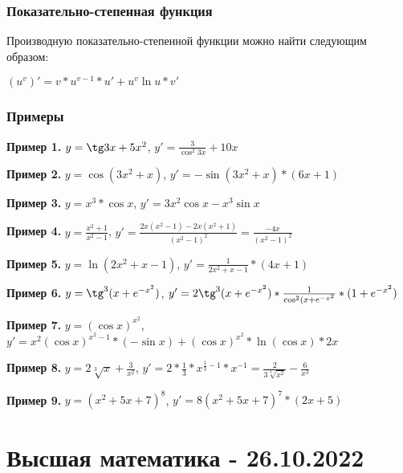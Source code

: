 \documentclass{article}
\begin{document}
\begin{flushleft}
\subsubsection{Показательно-степенная функция}

Производную показательно-степенной функции можно найти следующим образом:

$(u^v)' = v * u^{v - 1} * u' + u^v \ln u * v'$

\subsubsection{Примеры}

\textbf{Пример 1.} $y = \tg 3x + 5x^2$, $y' = \frac{3}{\cos^{2} 3x} + 10x$

\hfill

\textbf{Пример 2.} $y = \cos (3x^2 + x)$, $y' = -\sin(3x^2 + x) * (6x + 1)$

\hfill

\textbf{Пример 3.} $y = x^3 * \cos x$, $y' = 3x^2 \cos x - x^3 \sin x$

\hfill

\textbf{Пример 4.} $y = \frac{x^2 + 1}{x^2 - 1}$, $y' = \frac{2x(x^2 - 1) - 2x(x^2 + 1)}{(x^2 - 1)^2} = \frac{-4x}{(x^2 - 1)^2}$

\hfill

\textbf{Пример 5.} $y = \ln (2x^2 + x - 1)$, $y' = \frac{1}{2x^2 + x - 1} * (4x + 1)$

\hfill

\textbf{Пример 6.} $y = \tg^3 (x + e^{-x^2})$, $y' = 2 \tg^3 (x + e^{-x^2}) * \frac{1}{\cos^2(x+e^{-x^2}} * (1 + e^{-x^2})$

\hfill

\textbf{Пример 7. } $y = (\cos x)^{x^2}$, $y' = x^2 (\cos x)^{x^2 - 1} * (-\sin x) + (\cos x)^{x^2} * \ln (\cos x) * 2x$

\hfill

\textbf{Пример 8.} $y = 2 \sqrt[3]{x} + \frac{3}{x^2}$, $y' = 2 * \frac{1}{3} * x^{\frac{1}{3} - 1} * x^{-1} = \frac{2}{3\sqrt[3]{x^2}} - \frac{6}{x^3}$

\hfill

\textbf{Пример 9.} $y = (x^2 + 5x + 7)^{8}$, $y' = 8(x^2 + 5x + 7)^{7} * (2x + 5)$

\end{flushleft}

\pagebreak
\section{Высшая математика - 26.10.2022}
\end{document}

